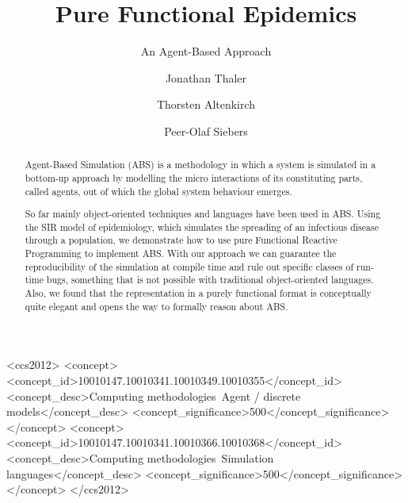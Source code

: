 \documentclass[format=sigconf, review=false, screen=true]{acmart}
\begin{document}

\title[Pure Functional Epidemics]{Pure Functional Epidemics}
\subtitle{An Agent-Based Approach}

\author{Jonathan Thaler}
\author{Thorsten Altenkirch}
\author{Peer-Olaf Siebers}

\begin{abstract}
Agent-Based Simulation (ABS) is a methodology in which a system is simulated in a bottom-up approach by modelling the micro interactions of its constituting parts, called agents, out of which the global system behaviour emerges.

So far mainly object-oriented techniques and languages have been used in ABS. Using the SIR model of epidemiology, which simulates the spreading of an infectious disease through a population, we demonstrate how to use pure Functional Reactive Programming to implement ABS. With our approach we can guarantee the reproducibility of the simulation at compile time and rule out specific classes of run-time bugs, something that is not possible with traditional object-oriented languages. Also, we found that the representation in a purely functional format is conceptually quite elegant and opens the way to formally reason about ABS.
\end{abstract}


\begin{CCSXML}
<ccs2012>
<concept>
<concept_id>10010147.10010341.10010349.10010355</concept_id>
<concept_desc>Computing methodologies~Agent / discrete models</concept_desc>
<concept_significance>500</concept_significance>
</concept>
<concept>
<concept_id>10010147.10010341.10010366.10010368</concept_id>
<concept_desc>Computing methodologies~Simulation languages</concept_desc>
<concept_significance>500</concept_significance>
</concept>
</ccs2012>
\end{CCSXML}

\maketitle
\end{document}

